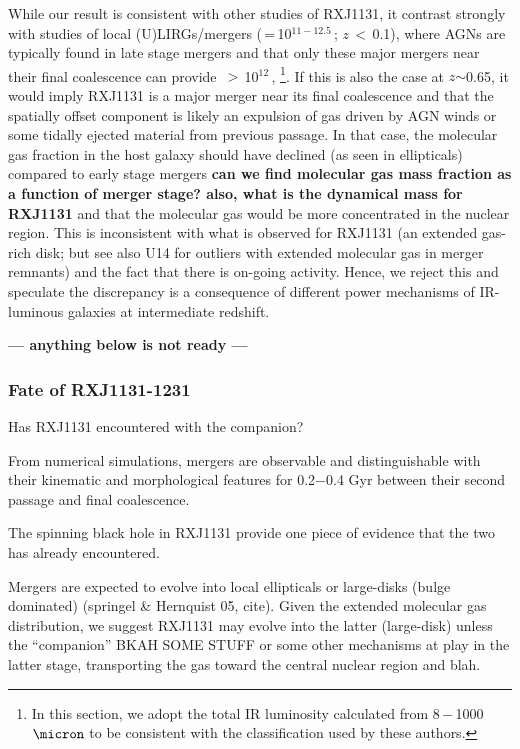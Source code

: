 \documentclass[]{emulateapj}
\begin{document}
While our result is consistent with other studies of RXJ1131, it
contrast strongly with studies of local (U)LIRGs/mergers
(\LIR\,=\,10$^{11-12.5}$\,\Lsun; $z$\,$<$\,0.1), where AGNs are
typically found in late stage mergers
\citep{Yuan10a,Iwasawa11a,Carpineti12a} and
that only these major mergers near their final
coalescence can provide \LIR\,$>$\,10$^{12}$\,\Lsun,
\citep[\eg][hereafter L16]{Carpineti15a,Larson16a}
\footnote{In this section, we adopt the total IR luminosity
calculated from 8\,$-$\,1000\,$\micron$
to be consistent with the classification used by these authors.}.
If this is also the case at $z$$\sim$0.65, it would imply RXJ1131
is a major merger near its final coalescence and that the spatially offset
component is likely an expulsion of gas driven by AGN winds or some
tidally ejected material from previous passage.
In that case, the molecular gas fraction in the host
galaxy should have declined (as seen in ellipticals) compared to early
stage mergers
\textbf{can we find molecular gas mass fraction as a
function of merger stage? also, what is the dynamical mass for RXJ1131}
and that the molecular gas would
be more concentrated in the nuclear region.
This is inconsistent with what
is observed for RXJ1131
(an extended gas-rich disk; but see also U14 for outliers
with extended molecular gas in merger remnants) and
the fact that there is on-going \SF activity.
Hence, we reject this and speculate the discrepancy is a consequence
of different power mechanisms of IR-luminous galaxies at intermediate redshift.

{\bf --- anything below is not ready ---}
\subsubsection{Fate of RXJ1131-1231}
Has RXJ1131 encountered with the companion?

From numerical simulations, mergers are observable and distinguishable
with their kinematic and morphological features for 0.2$-$0.4 Gyr
between their second passage and final coalescence.

The spinning black hole in RXJ1131 provide one piece of
evidence that the two has already encountered.


Mergers are expected to evolve into
local ellipticals or large-disks (bulge dominated) (springel \& Hernquist 05, cite).
Given the
extended molecular gas distribution, we suggest RXJ1131 may evolve into the
latter (large-disk) unless the ``companion'' BKAH SOME STUFF or some other
mechanisms at play in the latter stage, transporting the gas
toward the central nuclear region and blah.
\end{document}
